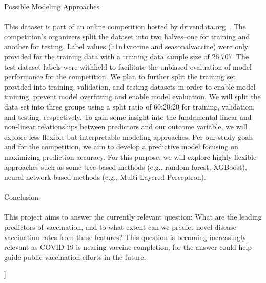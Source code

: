 \documentclass{IEEEtran}
\begin{document}
\begin{@twocolumnfalse}
{\huge Possible Modeling Approaches}\\\\
This dataset is part of an online competition hosted by drivendata.org~\cite{drivendata}. The competition's organizers split the dataset into two halves--one for training and another for testing. Label values (h1n1\textunderscore vaccine and seasonal\textunderscore vaccine) were only provided for the training data with a training data sample size of 26,707. The test dataset labels were withheld to facilitate the unbiased evaluation of model performance for the competition. We plan to further split the training set provided into training, validation, and testing datasets in order to enable model training, prevent model overfitting and enable model evaluation. We will split the data set into three groups using a split ratio of 60:20:20 for training, validation, and testing, respectively. 
To gain some insight into the fundamental linear and non-linear relationships between predictors and our outcome variable, we will explore less flexible but interpretable modeling approaches. Per our study goals and for the competition, we aim to develop a predictive model focusing on maximizing prediction accuracy. For this purpose, we will explore highly flexible approaches such as some tree-based methods (e.g., random forest, XGBoost), neural network-based methods (e.g., Multi-Layered Perceptron).\\\\ 
{\huge Conclusion}\\\\
This project aims to answer the currently relevant question: What are the leading predictors of vaccination, and to what extent can we predict novel disease vaccination rates from these features? This question is becoming increasingly relevant as COVID-19 is nearing vaccine completion, for the answer could help guide public vaccination efforts in the future. 
\end{@twocolumnfalse}
]
\end{document}
